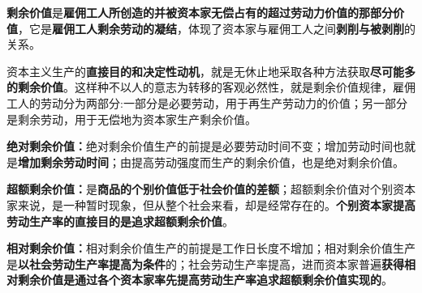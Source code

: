 \textbf{{剩余价值}}是\textbf{雇佣工人所创造的并被资本家无偿占有的超过劳动力价值的那部分价值}，它是\textbf{雇佣工人剩余劳动的凝结}，体现了资本家与雇佣工人之间\textbf{剥削与被剥削}的关系。

资本主义生产的\textbf{直接目的和决定性动机}，就是无休止地采取各种方法获取\textbf{尽可能多的剩余价值}。这样种不以人的意志为转移的客观必然性，就是剩余价值规律，雇佣工人的劳动分为两部分:一部分是必要劳动，用于再生产劳动力的价值；另一部分是剩余劳动，用于无偿地为资本家生产剩余价值。

\textbf{{绝对剩余价值}：}绝对剩余价值生产的前提是必要劳动时间不变；增加劳动时间也就是\textbf{增加剩余劳动时间}；由提高劳动强度而生产的剩余价值，也是绝对剩余价值。

\textbf{{超额剩余价值{：}}}{是}\textbf{商品的个别价值低于社会价值的差额}{；超额剩余价值对个别资本家来说，是一种暂时现象，但从整个社会来看，却是经常存在的。}\textbf{个别资本家提高劳动生产率的直接目的是追求超额剩余价值}{。}

\textbf{\textbf{{相对剩余价值}}}{\textbf{：}相对剩余价值生产的前提是工作日长度不增加；相对剩余价值生产是}\textbf{以社会劳动生产率提高为条件}{的；社会劳动生产率提高，进而资本家普遍}\textbf{获得相对剩余价值是通过各个资本家率先提高劳动生产率追求超额剩余价值实现的}{。}
